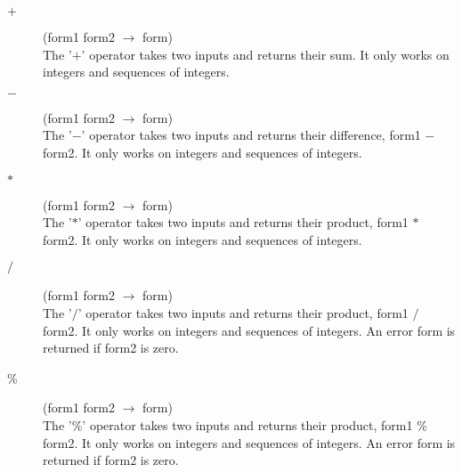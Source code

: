 \documentclass[12pt]{article}
\newcommand{\stackcmd}[3]{\item[{#1}] \hfill ({#2} $\rightarrow{}$ {#3}) \\}
\begin{document}
\begin{description}

\stackcmd{$+$}{form1 form2}{form} The '$+$' operator takes two inputs
and returns their sum.  It only works on integers and sequences of
integers.

\stackcmd{$-$}{form1 form2}{form} The '$-$' operator takes two inputs
and returns their difference, form1 $-$ form2.  It only works on
integers and sequences of integers.

\stackcmd{$*$}{form1 form2}{form} The '$*$' operator takes two inputs
and returns their product, form1 $*$ form2.  It only works on integers
and sequences of integers.

\stackcmd{$/$}{form1 form2}{form} The '$/$' operator takes two inputs
and returns their product, form1 $/$ form2.  It only works on integers
and sequences of integers.  An error form is returned if form2 is zero.

\stackcmd{\%}{form1 form2}{form} The '\%' operator takes two inputs
and returns their product, form1 \% form2.  It only works on integers
and sequences of integers.  An error form is returned if form2 is zero.

\end{description}
\end{document}
